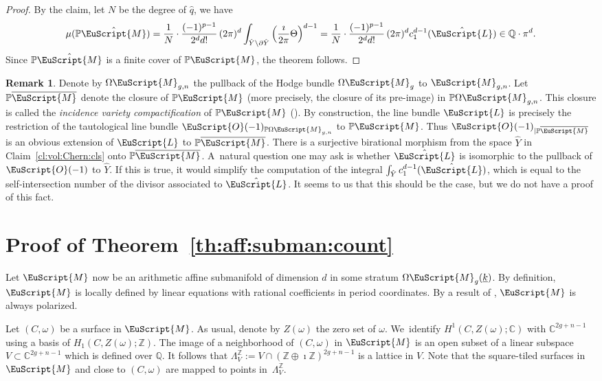 \documentclass[JEP,XML,SOM,Unicode]{cedram}
\let\mathcal\EuScript
\theoremstyle{plain}
\theoremstyle{definition}
\newtheorem{Remark}[Theorem]{Remark}
\def\C{\mathbb{C}}
\newcommand\Z{\mathbb{Z}}
\newcommand{\Q}{\mathbb{Q}}
\newcommand{\Pb}{\mathbb{P}}
\newcommand{\Lcal}{\mathcal{L}}
\newcommand{\Mcal}{\mathcal{M}}
\newcommand{\Ocal}{\mathcal{O}}
\newcommand{\cL}{\mathcal{L}}
\newcommand{\cM}{\mathcal{M}}
\let\omg\omega
\let\ol\overline
\let\ul\underline
\newcommand{\trate}{\Omega\Mcal_{g}(\ul{k})}
\begin{document}
\begin{proof}
By the claim, let $N$ be the degree of $\hat{q}$, we have
\[
\mu(\Pb\hat{\cM})=\frac{1}{N}\cdot\frac{(-1)^{p-1}}{2^d d!}\,(2\pi)^d\int_{\hat{Y}\setminus\partial\hat{Y}}\left(\frac{\imath}{2\pi}\Theta\right)^{d-1} = \frac{1}{N}\cdot\frac{(-1)^{p-1}}{2^d d!}\,(2\pi)^d c_1^{d-1}(\hat{\cL})\in \Q\cdot\pi^d.
\]
Since $\Pb\hat{\cM}$ is a finite cover of $\Pb\cM$, the theorem follows.
\end{proof}

\begin{Remark}\label{rk:compare:ext:line:bdl}
Denote by $\Omega\Mcal_{g,n}$ the pullback of the Hodge bundle $\Omega\Mcal_g$ to $\Mcal_{g,n}$.
Let $\Pb\ol{\cM}$ denote the closure of $\Pb\Mcal$ (more precisely, the closure of its pre-image) in $\Pb\Omega\Mcal_{g,n}$.
This closure is called the \emph{incidence variety compactification} of $\Pb\cM$ (\cf \cite{BCGGM:abel}).
By construction, the line bundle $\Lcal$ is precisely the restriction of the tautological line bundle $\Ocal(-1)_{\Pb\Omega\Mcal_{g,n}}$ to $\Pb\cM$.
Thus $\Ocal(-1)_{|\Pb\ol{\Mcal}}$ is an obvious extension of $\Lcal$ to $\Pb\ol{\Mcal}$.
There is a surjective birational morphism from the space $\hat{Y}$ in Claim~\ref{cl:vol:Chern:cls} onto $\Pb\ol{\Mcal}$.
A~natural question one may ask is whether $\hat{\Lcal}$ is isomorphic to the pullback of $\Ocal(-1)$ to $\hat{Y}$.
If this is true, it would simplify the computation of the integral $\int_{\hat{Y}}c_1^{d-1}(\hat{\Lcal})$, which is equal to the self-intersection number of the divisor associated to $\hat{\Lcal}$.
It seems to us that this should be the case, but we do not have a proof of this fact.
\end{Remark}

\section{Proof of Theorem~\ref{th:aff:subman:count}}\label{sec:proof:theorem2}
Let $\Mcal$ now be an arithmetic affine submanifold of dimension $d$ in some stratum $\trate$.
By definition, $\Mcal$ is locally defined by linear equations with rational coefficients in period coordinates.
By a result of \cite{AEM17}, $\Mcal$ is always polarized.

Let $(C,\omega)$ be a surface in $\Mcal$. As usual, denote by $Z(\omega)$ the zero set of $\omega$.
We~identify $H^1(C,Z(\omg);\C)$ with $\C^{2g+n-1}$ using a basis of $H_1(C,Z(\omg);\Z)$.
The image of a neighborhood of $(C,\omega)$ in $\Mcal$ is an open subset of a linear subspace $V\subset \C^{2g+n-1}$ which is defined over $\Q$.
It follows that $\Lambda^\Z_V:=V\cap (\Z\oplus\imath\Z)^{2g+n-1}$ is a lattice in $V$.
Note that the square-tiled surfaces in $\cM$ and close to $(C,\omg)$ are mapped to points in~$\Lambda^\Z_V$.
\end{document}
